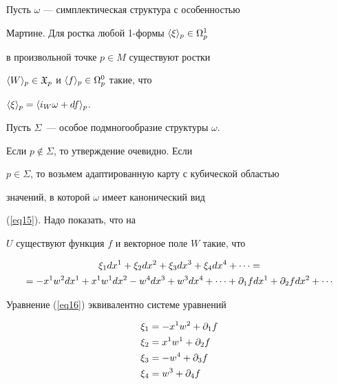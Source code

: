 \begin{lem} \label{lm3}


Пусть $\omega$  --- симплектическая структура с особенностью


Мартине. Для ростка любой 1-формы $\langle \xi \rangle_{p} \in \Omega^1_p$


в произвольной точке $p \in M$ существуют ростки


$\langle W \rangle_{p} \in {\frak X}_p$ и $\langle f \rangle_{p} \in \Omega^0_p$ такие, что


$\langle \xi \rangle_{p} = \langle i_W \omega + df \rangle_{p}$.


\end{lem}





\begin{pf}


Пусть $\Sigma$~--- особое подмногообразие структуры $\omega$.


Если $p \notin \Sigma$, то утверждение очевидно. Если


$p \in \Sigma$, то возьмем адаптированную карту с кубической областью


значений, в которой $\omega$ имеет канонический вид


(\ref{eq15}). Надо показать, что на


$U$ существуют функция $f$ и векторное поле $W$ такие, что


\begin{multline}\label{eq16}


\xi_1 dx^1 + \xi_2 dx^2 + \xi_3 dx^3  + \xi_4 dx^4 +


\dotsb =\\


=-x^1 w^2 dx^1 + x^1 w^1 dx^2 -  w^4 dx^3 + w^3 dx^4 +


\dotsb + \pd_1 f dx^1 + \pd_2 f dx^2 + \dotsb


\end{multline}


Уравнение (\ref{eq16}) эквивалентно системе уравнений


\begin{align*} \label{eq11}


\xi_1 &= -x^1 w^2 + \pd_1 f \\


\xi_2 &=  x^1 w^1 + \pd_2 f \\


\xi_3 &=   - w^4 + \pd_3 f \\


\xi_4 &=  w^3 + \pd_4 f \\



\end{align*}
\end{pf}
